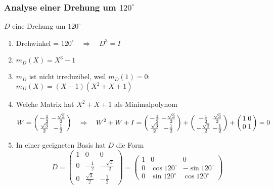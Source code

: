 %
%
%
\begin{frame}[t]
\frametitle{Analyse einer Drehung um $120^\circ$}
$D$ eine Drehung um $120^\circ$
\begin{enumerate}
\item
Drehwinkel = $120^\circ\quad\Rightarrow\quad D^3 = I$
\item
$m_D(X)=X^3-1$
\item 
$m_D$ ist nicht irreduzibel, weil $m_D(1)=0$:
$
m_D(X) = (X-1)(X^2+X+1)
$
\item
Welche Matrix hat $X^2+X+1$ als Minimalpolynom
\[
\arraycolsep=1.4pt
W
=
\biggl(\begin{array}{cc}
-\frac12          & -\frac{\sqrt{3}}2 \\
 \frac{\sqrt{3}}2 & -\frac12
\end{array}\biggr)
\quad\Rightarrow\quad
W^2+W+I
=
\biggl(\begin{array}{cc}
-\frac12          & -\frac{\sqrt{3}}2 \\
 \frac{\sqrt{3}}2 & -\frac12
\end{array}\biggr)
+
\biggl(\begin{array}{cc}
-\frac12          & \frac{\sqrt{3}}2 \\
 -\frac{\sqrt{3}}2 & -\frac12
\end{array}\biggr)
+
\biggl(\begin{array}{cc}
1&0\\0&1
\end{array}\biggr)
=0
\]
\item In einer geeigneten Basis hat $D$ die Form
\[
D=\begin{pmatrix}
1&0&0\\
0&-\frac12 & -\frac{\sqrt{3}}2 \\
0&\frac{\sqrt{3}}2 & -\frac12
\end{pmatrix}
=
\begin{pmatrix}
1&0&0\\
0&\cos 120^\circ & -\sin 120^\circ\\
0&\sin 120^\circ & \cos 120^\circ
\end{pmatrix}
\]
\end{enumerate}
\end{frame}
